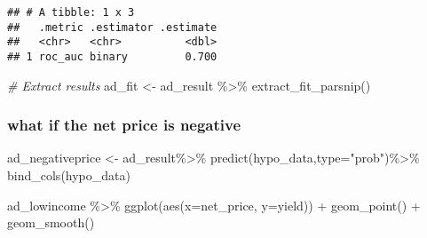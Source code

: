 \documentclass[
]{article}
\newenvironment{Shaded}{\begin{snugshade}}{\end{snugshade}}
\newcommand{\AttributeTok}[1]{\textcolor[rgb]{0.77,0.63,0.00}{#1}}
\newcommand{\CommentTok}[1]{\textcolor[rgb]{0.56,0.35,0.01}{\textit{#1}}}
\newcommand{\DecValTok}[1]{\textcolor[rgb]{0.00,0.00,0.81}{#1}}
\newcommand{\FloatTok}[1]{\textcolor[rgb]{0.00,0.00,0.81}{#1}}
\newcommand{\FunctionTok}[1]{\textcolor[rgb]{0.00,0.00,0.00}{#1}}
\newcommand{\NormalTok}[1]{#1}
\newcommand{\OtherTok}[1]{\textcolor[rgb]{0.56,0.35,0.01}{#1}}
\newcommand{\SpecialCharTok}[1]{\textcolor[rgb]{0.00,0.00,0.00}{#1}}
\newcommand{\StringTok}[1]{\textcolor[rgb]{0.31,0.60,0.02}{#1}}
\begin{document}
\begin{verbatim}
## # A tibble: 1 x 3
##   .metric .estimator .estimate
##   <chr>   <chr>          <dbl>
## 1 roc_auc binary         0.700
\end{verbatim}

\begin{Shaded}
\begin{Highlighting}[]
\CommentTok{\# Extract results}
\NormalTok{ad\_fit }\OtherTok{\textless{}{-}}\NormalTok{ ad\_result }\SpecialCharTok{\%\textgreater{}\%} \FunctionTok{extract\_fit\_parsnip}\NormalTok{()}
\end{Highlighting}
\end{Shaded}

\hypertarget{what-if-the-net-price-is-negative}{%
\subsubsection{what if the net price is
negative}\label{what-if-the-net-price-is-negative}}

\begin{Shaded}
\end{Shaded}

\begin{Shaded}
\begin{Highlighting}[]
\NormalTok{ad\_negativeprice }\OtherTok{\textless{}{-}}\NormalTok{ ad\_result}\SpecialCharTok{\%\textgreater{}\%}
  \FunctionTok{predict}\NormalTok{(hypo\_data,}\AttributeTok{type=}\StringTok{"prob"}\NormalTok{)}\SpecialCharTok{\%\textgreater{}\%}
  \FunctionTok{bind\_cols}\NormalTok{(hypo\_data)}
\end{Highlighting}
\end{Shaded}

\begin{Shaded}
\begin{Highlighting}[]
\NormalTok{ad\_lowincome }\SpecialCharTok{\%\textgreater{}\%}
  \FunctionTok{ggplot}\NormalTok{(}\FunctionTok{aes}\NormalTok{(}\AttributeTok{x=}\NormalTok{net\_price, }\AttributeTok{y=}\NormalTok{yield)) }\SpecialCharTok{+} 
  \FunctionTok{geom\_point}\NormalTok{() }\SpecialCharTok{+}
  \FunctionTok{geom\_smooth}\NormalTok{()}
\end{Highlighting}
\end{Shaded}
\end{document}
